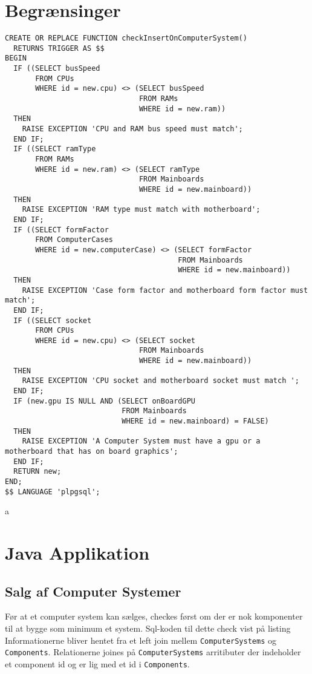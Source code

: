 \documentclass[a4paper]{article}
\begin{document}
\section{Begrænsinger}
\begin{listing}[H]
\begin{verbatim}
CREATE OR REPLACE FUNCTION checkInsertOnComputerSystem()
  RETURNS TRIGGER AS $$
BEGIN
  IF ((SELECT busSpeed
       FROM CPUs
       WHERE id = new.cpu) <> (SELECT busSpeed
                               FROM RAMs
                               WHERE id = new.ram))
  THEN
    RAISE EXCEPTION 'CPU and RAM bus speed must match';
  END IF;
  IF ((SELECT ramType
       FROM RAMs
       WHERE id = new.ram) <> (SELECT ramType
                               FROM Mainboards
                               WHERE id = new.mainboard))
  THEN
    RAISE EXCEPTION 'RAM type must match with motherboard';
  END IF;
  IF ((SELECT formFactor
       FROM ComputerCases
       WHERE id = new.computerCase) <> (SELECT formFactor
                                        FROM Mainboards
                                        WHERE id = new.mainboard))
  THEN
    RAISE EXCEPTION 'Case form factor and motherboard form factor must match';
  END IF;
  IF ((SELECT socket
       FROM CPUs
       WHERE id = new.cpu) <> (SELECT socket
                               FROM Mainboards
                               WHERE id = new.mainboard))
  THEN
    RAISE EXCEPTION 'CPU socket and motherboard socket must match ';
  END IF;
  IF (new.gpu IS NULL AND (SELECT onBoardGPU
                           FROM Mainboards
                           WHERE id = new.mainboard) = FALSE)
  THEN
    RAISE EXCEPTION 'A Computer System must have a gpu or a motherboard that has on board graphics';
  END IF;
  RETURN new;
END;
$$ LANGUAGE 'plpgsql';
\end{verbatim}
\caption{a}
\label{lst:triggerfunc}
\end{listing}

\section{Java Applikation}

\subsection{Salg af Computer Systemer}
Før at et computer system kan sælges, checkes først om der er nok komponenter til at bygge som minimum et system. 
Sql-koden til dette check vist på listing %
Informationerne bliver hentet fra et left join mellem \texttt{ComputerSystems} og \texttt{Components}. Relationerne joines på \texttt{ComputerSystems} arritibuter der indeholder et component id og er lig med et id i \texttt{Components}.
\end{document}
